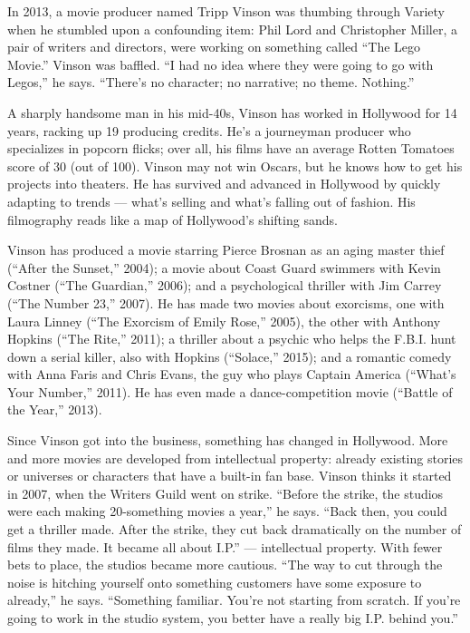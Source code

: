 In 2013, a movie producer named Tripp Vinson was thumbing through
Variety when he stumbled upon a confounding item: Phil Lord and
Christopher Miller, a pair of writers and directors, were working on
something called ``The Lego Movie.'' Vinson was baffled. ``I had no idea
where they were going to go with Legos,'' he says. ``There's no
character; no narrative; no theme. Nothing.''

A sharply handsome man in his mid-40s, Vinson has worked in Hollywood
for 14 years, racking up 19 producing credits. He's a journeyman
producer who specializes in popcorn flicks; over all, his films have an
average Rotten Tomatoes score of 30 (out of 100). Vinson may not win
Oscars, but he knows how to get his projects into theaters. He has
survived and advanced in Hollywood by quickly adapting to trends ---
what's selling and what's falling out of fashion. His filmography reads
like a map of Hollywood's shifting sands.

Vinson has produced a movie starring Pierce Brosnan as an aging master
thief (``After the Sunset,'' 2004); a movie about Coast Guard swimmers
with Kevin Costner (``The Guardian,'' 2006); and a psychological
thriller with Jim Carrey (``The Number 23,'' 2007). He has made two
movies about exorcisms, one with Laura Linney (``The Exorcism of Emily
Rose,'' 2005), the other with Anthony Hopkins (``The Rite,'' 2011); a
thriller about a psychic who helps the F.B.I. hunt down a serial killer,
also with Hopkins (``Solace,'' 2015); and a romantic comedy with Anna
Faris and Chris Evans, the guy who plays Captain America (``What's Your
Number,'' 2011). He has even made a dance-­competition movie (``Battle
of the Year,'' 2013).

Since Vinson got into the business, something has changed in Hollywood.
More and more movies are developed from intellectual property: already
existing stories or universes or characters that have a built-in fan
base. Vinson thinks it started in 2007, when the Writers Guild went on
strike. ``Before the strike, the studios were each making 20-­something
movies a year,'' he says. ``Back then, you could get a thriller made.
After the strike, they cut back dramatically on the number of films they
made. It became all about I.P.'' --- intellectual property. With fewer
bets to place, the studios became more cautious. ``The way to cut
through the noise is hitching yourself onto something customers have
some exposure to already,'' he says. ``Something familiar. You're not
starting from scratch. If you're going to work in the studio system, you
better have a really big I.P. behind you.''

